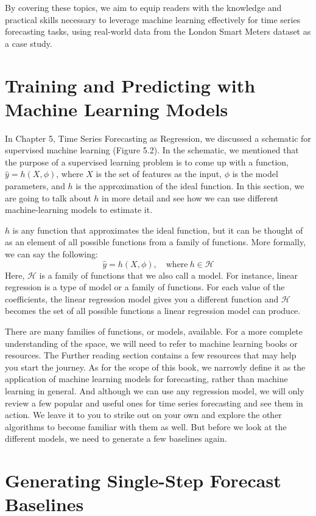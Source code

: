 \documentclass{article}
\begin{document}
By covering these topics, we aim to equip readers with the knowledge and practical skills necessary to leverage machine learning effectively for time series forecasting tasks, using real-world data from the London Smart Meters dataset as a case study.

\section{Training and Predicting with Machine Learning Models}

In Chapter 5, Time Series Forecasting as Regression, we discussed a schematic for supervised machine learning (Figure 5.2). In the schematic, we mentioned that the purpose of a supervised learning problem is to come up with a function, $\hat{y} = h(X, \phi)$, where $X$ is the set of features as the input, $\phi$ is the model parameters, and $h$ is the approximation of the ideal function. In this section, we are going to talk about $h$ in more detail and see how we can use different machine-learning models to estimate it.

$h$ is any function that approximates the ideal function, but it can be thought of as an element of all possible functions from a family of functions. More formally, we can say the following:
\[ \hat{y} = h(X, \phi), \quad \text{where} \ h \in \mathcal{H} \]
Here, $\mathcal{H}$ is a family of functions that we also call a model. For instance, linear regression is a type of model or a family of functions. For each value of the coefficients, the linear regression model gives you a different function and $\mathcal{H}$ becomes the set of all possible functions a linear regression model can produce.

There are many families of functions, or models, available. For a more complete understanding of the space, we will need to refer to machine learning books or resources. The Further reading section contains a few resources that may help you start the journey. As for the scope of this book, we narrowly define it as the application of machine learning models for forecasting, rather than machine learning in general. And although we can use any regression model, we will only review a few popular and useful ones for time series forecasting and see them in action. We leave it to you to strike out on your own and explore the other algorithms to become familiar with them as well. But before we look at the different models, we need to generate a few baselines again.

\section{Generating Single-Step Forecast Baselines}
\end{document}
